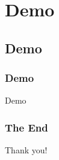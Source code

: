 \documentclass{beamer}
\begin{document}
\section{Demo}
\subsection{Demo}
\begin{frame}
\frametitle{Demo}
\Huge{\centerline{Demo}}
\end{frame}
\begin{frame}
\frametitle{The End}
\Huge{\centerline{Thank you!}}
\end{frame}

\end{document}
